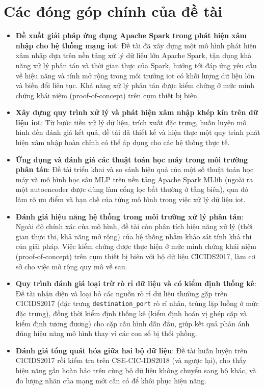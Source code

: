 \section{Các đóng góp chính của đề tài}
\label{sec:DongGop}
\begin{itemize}
  \item \textbf{Đề xuất giải pháp ứng dụng Apache Spark trong phát hiện xâm nhập cho hệ thống mạng \ac{iot}}: Đề tài đã xây dựng một mô hình phát hiện xâm nhập dựa trên nền tảng xử lý dữ liệu lớn Apache Spark, tận dụng khả năng xử lý phân tán và thời gian thực của Spark, hướng tới đáp ứng yêu cầu về hiệu năng và tính mở rộng trong môi trường \ac{iot} có khối lượng dữ liệu lớn và biến đổi liên tục. Khả năng xử lý phân tán được kiểm chứng ở mức minh chứng khái niệm (proof-of-concept) trên cụm thiết bị biên.
  \item \textbf{Xây dựng quy trình xử lý và phát hiện xâm nhập khép kín trên dữ liệu \ac{iot}}: Từ bước tiền xử lý dữ liệu, trích xuất đặc trưng, huấn luyện mô hình đến đánh giá kết quả, đề tài đã thiết kế và hiện thực một quy trình phát hiện xâm nhập hoàn chỉnh có thể áp dụng cho các hệ thống thực tế.
  \item \textbf{Ứng dụng và đánh giá các thuật toán học máy trong môi trường phân tán}: Đề tài triển khai và so sánh hiệu quả của một số thuật toán học máy và mô hình học sâu MLP trên nền tảng Apache Spark MLlib (ngoài ra một autoencoder được dùng làm cổng lọc bất thường ở tầng biên), qua đó làm rõ ưu điểm và hạn chế của từng mô hình trong việc xử lý dữ liệu \ac{iot}.
  \item \textbf{Đánh giá hiệu năng hệ thống trong môi trường xử lý phân tán}: Ngoài độ chính xác của mô hình, đề tài còn phân tích hiệu năng xử lý (thời gian thực thi, khả năng mở rộng) của hệ thống nhằm khảo sát tính khả thi của giải pháp. Việc kiểm chứng được thực hiện ở mức minh chứng khái niệm (proof-of-concept) trên cụm thiết bị biên với bộ dữ liệu CICIDS2017, làm cơ sở cho việc mở rộng quy mô về sau.
  \item \textbf{Quy trình đánh giá loại trừ rò rỉ dữ liệu và có kiểm định thống kê}: Đề tài nhận diện và loại bỏ các nguồn rò rỉ dữ liệu thường gặp trên CICIDS2017 (đặc trưng \texttt{destination\_port} rò rỉ nhãn, trùng lặp luồng ở mức đặc trưng), đồng thời kiểm định thống kê (kiểm định hoán vị ghép cặp và kiểm định tương đương) cho cặp cấu hình dẫn đầu, giúp kết quả phản ánh đúng hiệu năng mô hình thay vì các con số bị thổi phồng.
  \item \textbf{Đánh giá tổng quát hóa giữa hai bộ dữ liệu}: Đề tài huấn luyện trên CICIDS2017 rồi kiểm tra trên CSE-CIC-IDS2018 (và ngược lại), cho thấy hiệu năng gần hoàn hảo trên cùng bộ dữ liệu không chuyển sang bộ khác, và đo lượng nhãn của mạng mới cần có để khôi phục hiệu năng.
\end{itemize}

